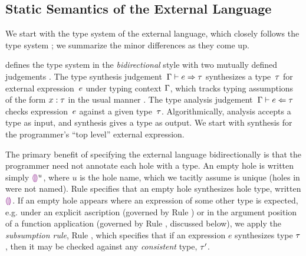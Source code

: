 
\subsection{Static Semantics of the External Language}
\label{sec:external-statics}



We start with the type system of the \HazelnutLive external language,
which closely follows the \Hazelnut type system \cite{popl-paper}; we summarize the minor differences as they come up.


 defines the type system in the \emph{bidirectional} style
%
with two mutually defined judgements \cite{Pierce:2000ve,bidi-tutorial,DBLP:conf/icfp/DunfieldK13,Chlipala:2005da}. The type synthesis
judgement~$\Gamma \vdash e \Rightarrow \tau$ synthesizes a type~$\tau$
for external expression~$e$ under typing context $\Gamma$, which tracks typing
assumptions of the form $x : \tau$ in the usual
manner \cite{pfpl,tapl}.
%
The type analysis judgement~$\Gamma \vdash e \Leftarrow \tau$ checks
expression~$e$ against a given type~$\tau$.
%
Algorithmically, analysis accepts a type as input, and synthesis gives
a type as output.
%
We start with synthesis for the programmer's ``top level'' external
expression.


The primary benefit of specifying the \HazelnutLive external language
bidirectionally is that the programmer need not annotate each hole with a type.
%
An empty hole is
written simply $\textcolor{violet}{\llparenthesis}\textcolor{violet}{\rrparenthesis}^{u}$, where $u$ is the hole name, which we tacitly assume is unique
(holes in \Hazelnut were not named).
Rule  specifies that an empty hole synthesizes hole type, written $\textcolor{violet}{\llparenthesis}\textcolor{violet}{\rrparenthesis}$.
%
If an empty hole appears where an expression of some other type is
expected, e.g. under an explicit ascription (governed by Rule )
or in the argument position of a function application (governed by
Rule , discussed below), we apply the \emph{subsumption rule},
Rule , which specifies that if an expression $e$ synthesizes
type $\tau$, then it may be checked against any \emph{consistent}
type, $\tau'$.

